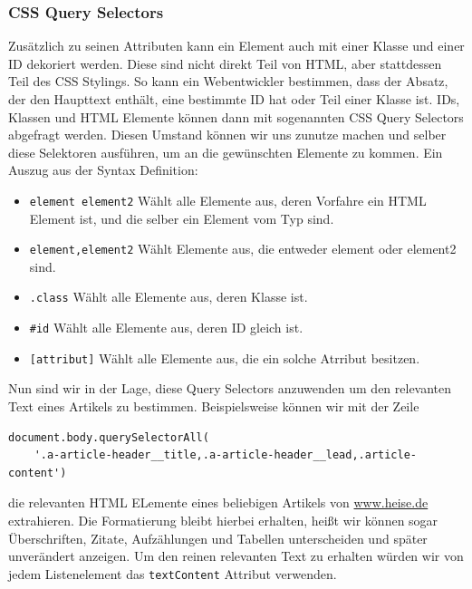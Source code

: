 \subsubsection*{CSS Query Selectors}
Zusätzlich zu seinen Attributen kann ein Element auch mit einer Klasse und einer ID dekoriert werden. Diese sind nicht direkt Teil von HTML, aber stattdessen Teil des CSS Stylings. So kann ein Webentwickler bestimmen, dass der Absatz, der den Haupttext enthält, eine bestimmte ID hat oder Teil einer Klasse ist. IDs, Klassen und HTML Elemente können dann mit sogenannten CSS Query Selectors abgefragt werden. Diesen Umstand können wir uns zunutze machen und selber diese Selektoren ausführen, um an die gewünschten Elemente zu kommen. Ein Auszug aus der Syntax Definition:
\begin{itemize}
	\item \texttt{element element2} Wählt alle Elemente aus, deren Vorfahre ein HTML Element  ist, und die selber ein Element vom Typ  sind.
	\item \texttt{element,element2} Wählt Elemente aus, die entweder element oder element2 sind.
	\item \texttt{.class} Wählt alle Elemente aus, deren Klasse  ist.
	\item \texttt{#id} Wählt alle Elemente aus, deren ID gleich  ist.
	\item \texttt{[attribut]} Wählt alle Elemente aus, die ein solche Atrribut besitzen.
\end{itemize}
Nun sind wir in der Lage, diese Query Selectors anzuwenden um den relevanten Text eines Artikels zu bestimmen. Beispielsweise können wir mit der Zeile 
\begin{verbatim}
document.body.querySelectorAll(
	'.a-article-header__title,.a-article-header__lead,.article-content')
\end{verbatim}
die relevanten HTML ELemente eines beliebigen Artikels von \url{www.heise.de} extrahieren. Die Formatierung bleibt hierbei erhalten, heißt wir können sogar Überschriften, Zitate, Aufzählungen und Tabellen unterscheiden und später unverändert anzeigen. Um den reinen relevanten Text zu erhalten würden wir von jedem Listenelement das \verb|textContent| Attribut verwenden.























